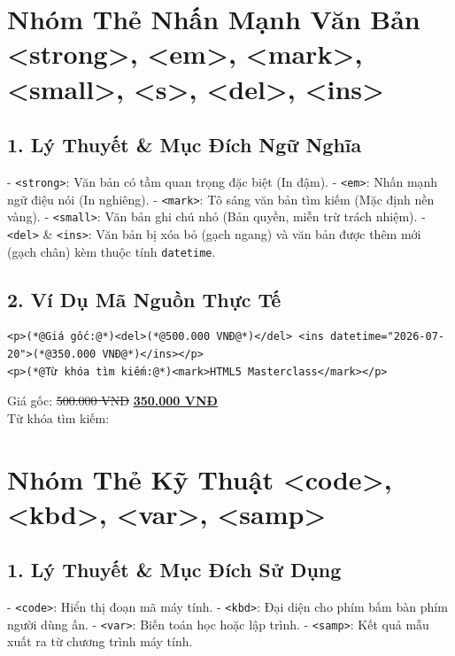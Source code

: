 \documentclass[11pt,oneside]{book}
\newcommand{\codeinline}[1]{\textcolor{accentOrange}{\texttt{#1}}}
\begin{document}
\section{Nhóm Thẻ Nhấn Mạnh Văn Bản <strong>, <em>, <mark>, <small>, <s>, <del>, <ins>}
\subsection{1. Lý Thuyết \& Mục Đích Ngữ Nghĩa}
- \codeinline{<strong>}: Văn bản có tầm quan trọng đặc biệt (In đậm).
- \codeinline{<em>}: Nhấn mạnh ngữ điệu nói (In nghiêng).
- \codeinline{<mark>}: Tô sáng văn bản tìm kiếm (Mặc định nền vàng).
- \codeinline{<small>}: Văn bản ghi chú nhỏ (Bản quyền, miễn trừ trách nhiệm).
- \codeinline{<del>} \& \codeinline{<ins>}: Văn bản bị xóa bỏ (gạch ngang) và văn bản được thêm mới (gạch chân) kèm thuộc tính \codeinline{datetime}.

\subsection{2. Ví Dụ Mã Nguồn Thực Tế}
\begin{codeWindow}
\begin{lstlisting}[language=HTML5]
<p>(*@Giá gốc:@*)<del>(*@500.000 VNĐ@*)</del> <ins datetime="2026-07-20">(*@350.000 VNĐ@*)</ins></p>
<p>(*@Từ khóa tìm kiếm:@*)<mark>HTML5 Masterclass</mark></p>
\end{lstlisting}
\end{codeWindow}

\begin{browserWindow}
\sffamily\small
Giá gốc: \sout{\color{gray!80}500.000 VNĐ} \;\; \underline{\color{primaryBlue}\bfseries 350.000 VNĐ}\\[4pt]
Từ khóa tìm kiếm: 
\end{browserWindow}

\section{Nhóm Thẻ Kỹ Thuật <code>, <kbd>, <var>, <samp>}
\subsection{1. Lý Thuyết \& Mục Đích Sử Dụng}
- \codeinline{<code>}: Hiển thị đoạn mã máy tính.
- \codeinline{<kbd>}: Đại diện cho phím bấm bàn phím người dùng ấn.
- \codeinline{<var>}: Biến toán học hoặc lập trình.
- \codeinline{<samp>}: Kết quả mẫu xuất ra từ chương trình máy tính.
\end{document}
